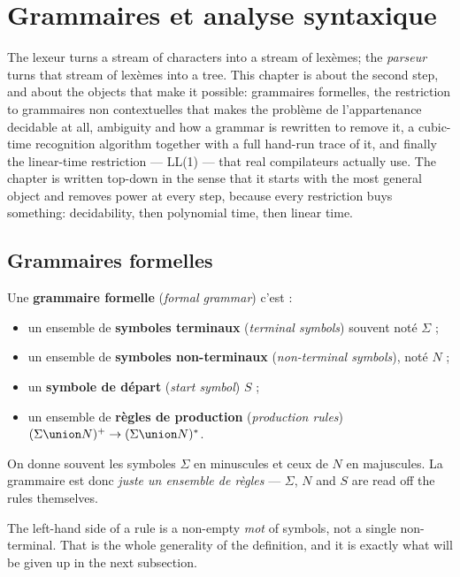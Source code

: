 \section{Grammaires et analyse syntaxique}
The lexeur turns a stream of characters into a stream of lexèmes; the
\textit{parseur} turns that stream of lexèmes into a tree. This chapter is about
the second step, and about the objects that make it possible: grammaires
formelles, the restriction to grammaires non contextuelles that makes the
problème de l'appartenance decidable at all, ambiguity and how a grammar is
rewritten to remove it, a cubic-time recognition algorithm together with a full
hand-run trace of it, and finally the linear-time restriction --- LL(1) --- that
real compilateurs actually use. The chapter is written top-down in the sense
that it starts with the most general
object and removes power at every step, because every restriction buys
something: decidability, then polynomial time, then linear time.

\subsection{Grammaires formelles}

\begin{definition}
  Une \textbf{grammaire formelle} (\textit{formal grammar}) c'est :
  \begin{itemize}
    \item un ensemble de \textbf{symboles terminaux} (\textit{terminal
      symbols}) souvent noté $\Sigma$ ;
    \item un ensemble de \textbf{symboles non-terminaux} (\textit{non-terminal
      symbols}), noté $N$ ;
    \item un \textbf{symbole de départ} (\textit{start symbol}) $S$ ;
    \item un ensemble de \textbf{règles de production} (\textit{production
      rules}) $(\Sigma \union N)^{+} \to (\Sigma \union N)^{*}$.
  \end{itemize}
\end{definition}

\begin{notation}
  On donne souvent les symboles $\Sigma$ en minuscules et ceux de $N$ en
  majuscules. La grammaire est donc \emph{juste un ensemble de règles} ---
  $\Sigma$, $N$ and $S$ are read off the rules themselves.
\end{notation}

The left-hand side of a rule is a non-empty \emph{mot} of symbols, not a
single non-terminal. That is the whole generality of the definition, and it is
exactly what will be given up in the next subsection.

